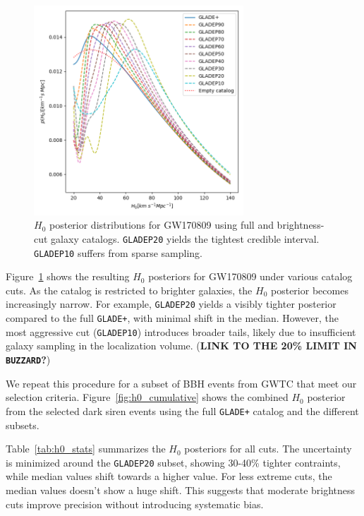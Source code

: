 \begin{figure}[h!]
  \centering
  \includegraphics[width=0.7\textwidth]{figures/GW170809_H0.png}
  \caption[$H_0$ posterior distributions for GW170809 using full and brightness-cut galaxy catalogs.]{$H_0$ posterior distributions for GW170809 using full and brightness-cut galaxy catalogs. \texttt{GLADEP20} yields the tightest credible interval. \texttt{GLADEP10} suffers from sparse sampling.}
  \label{fig:h0_gw170809}
\end{figure}

Figure~\ref{fig:h0_gw170809} shows the resulting $H_0$ posteriors for GW170809 under various catalog cuts. As the catalog is restricted to brighter galaxies, the $H_0$ posterior becomes increasingly narrow. For example, \texttt{GLADEP20} yields a visibly tighter posterior compared to the full \texttt{GLADE+}, with minimal shift in the median. However, the most aggressive cut (\texttt{GLADEP10}) introduces broader tails, likely due to insufficient galaxy sampling in the localization volume. (\textbf{LINK TO THE 20\% LIMIT IN \texttt{BUZZARD}?})

We repeat this procedure for a subset of \ac{BBH} events from \ac{GWTC} that meet our selection criteria. Figure~\ref{fig:h0_cumulative} shows the combined $H_0$ posterior from the selected dark siren events using the full \texttt{GLADE+} catalog and the different subsets.

Table~\ref{tab:h0_stats} summarizes the $H_0$ posteriors for all cuts. The uncertainty is minimized around the \texttt{GLADEP20} subset, showing 30-40\% tighter contraints, while median values shift towards a higher value. For less extreme cuts, the median values doesn't show a huge shift. This suggests that moderate brightness cuts improve precision without introducing systematic bias.

